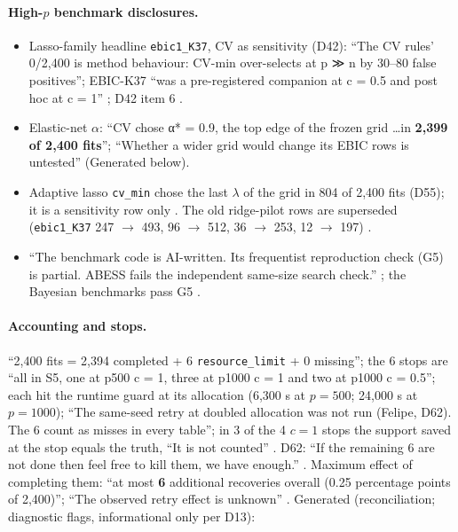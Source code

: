 \paragraph{High-$p$ benchmark disclosures.}
\begin{itemize}
\item Lasso-family headline \texttt{ebic1\_K37}, CV as sensitivity (D42): ``The CV rules' 0/2,400 is method behaviour: CV-min
over-selects at p ≫ n by 30–80 false positives''; EBIC-K37 ``was a pre-registered companion at c = 0.5 and post hoc at c = 1''
; D42 item 6 .
\item Elastic-net $\alpha$: ``CV chose α* = 0.9, the top edge of the frozen grid \dots in \textbf{2,399 of 2,400 fits}''; ``Whether
a wider grid would change its EBIC rows is untested'' 
(Generated below).
\item Adaptive lasso \texttt{cv\_min} chose the last $\lambda$ of the grid in 804 of 2,400 fits (D55); it is a sensitivity row only
. The old ridge-pilot rows are superseded
(\texttt{ebic1\_K37} 247 $\to$ 493, 96 $\to$ 512, 36 $\to$ 253, 12 $\to$ 197) .
\item ``The benchmark code is AI-written. Its frequentist reproduction check (G5) is partial. ABESS fails the independent same-size
search check.'' ; the Bayesian benchmarks pass G5
.
\end{itemize}


\paragraph{Accounting and stops.}  ``2,400 fits = 2,394 completed + 6 \texttt{resource\_limit} + 0 missing''; the 6
stops are ``all in S5, one at p500 c = 1, three at p1000 c = 1 and two at p1000 c = 0.5''; each hit the runtime guard at its allocation
(6,300 s at $p=500$; 24,000 s at $p=1000$); ``The same-seed retry at doubled allocation was not run (Felipe, D62). The 6 count as
misses in every table''; in 3 of the 4 $c=1$ stops the support saved at the stop equals the truth, ``It is not counted''
. D62: ``If the remaining 6 are not done then feel free to
kill them, we have enough.'' . Maximum effect of completing them: ``at most \textbf{6} additional
recoveries overall (0.25 percentage points of 2,400)''; ``The observed retry effect is unknown''
. Generated (reconciliation; diagnostic flags, informational
only per D13):



